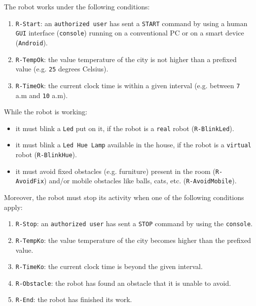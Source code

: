 \documentclass{../llncs}
\newcommand{\code}[1]{{\color{blue}\small{\texttt{#1}}}}
\newcommand{\fname}[1]{{\small{\color{magenta}\texttt{#1}}}}
\begin{document}
\noindent The robot works under the following conditions:
\begin{enumerate}
\item \code{R-Start}: an \code{authorized user} has sent a \texttt{START} command by using a human \texttt{GUI} interface (\code{console}) running on a conventional PC or on a smart device (\texttt{Android}).
\item \code{R-TempOk}: the value temperature of the city is not higher than a prefixed value (e.g. \texttt{25} degrees Celsius).
\item \code{R-TimeOk}: the current clock time is within a given interval (e.g. between \texttt{7} a.m and \texttt{10} a.m).
\end{enumerate}

\noindent While the robot is working:
\begin{itemize}[label={--}]
\item it must blink a \texttt{Led} put on it, if the robot is a \fname{real} robot (\code{R-BlinkLed}).
\item it must blink a \texttt{Led Hue Lamp} available in the house, if the robot is a \fname{virtual} robot (\code{R-BlinkHue}).
\item it must avoid fixed obstacles (e.g. furniture) present in the room (\code{R-AvoidFix}) and/or mobile obstacles like
balls, cats, etc. (\code{R-AvoidMobile}).
\end{itemize}

Moreover, the robot must stop its activity when one of the following conditions apply:
\begin{enumerate}
\item \code{R-Stop}: an \code{authorized user} has sent a \texttt{STOP} command by using the \code{console}.
\item \code{R-TempKo}: the value temperature of the city becomes higher than the prefixed value.
\item \code{R-TimeKo}: the current clock time is beyond the given interval.
\item \code{R-Obstacle}: the robot has found an obstacle that it is unable to avoid.
\item \code{R-End}: the robot has finished its work.
\end{enumerate}
\end{document}
